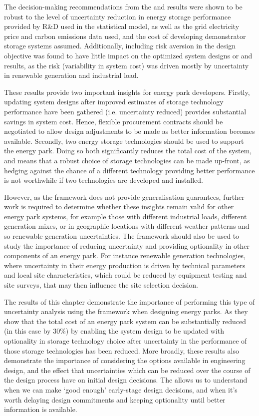 The decision-making recommendations from the  and  results were shown to be robust to the level of uncertainty reduction in energy storage performance provided by R\&D used in the statistical model, as well as the grid electricity price and carbon emissions data used, and the cost of developing demonstrator storage systems assumed.
Additionally, including risk aversion in the design objective was found to have little impact on the optimized system designs or  and  results, as the risk (variability in system cost) was driven mostly by uncertainty in renewable generation and industrial load.

These results provide two important insights for energy park developers. Firstly, updating system designs after improved estimates of storage technology performance have been gathered (i.e. uncertainty reduced) provides substantial savings in system cost. Hence, flexible procurement contracts should be negotiated to allow design adjustments to be made as better information becomes available. Secondly, two energy storage technologies should be used to support the energy park. Doing so both significantly reduces the total cost of the system, and means that a robust choice of storage technologies can be made up-front, as hedging against the chance of a different technology providing better performance is not worthwhile if two technologies are developed and installed.

However, as the  framework does not provide generalisation guarantees, further work is required to determine whether these insights remain valid for other energy park systems, for example those with different industrial loads, different generation mixes, or in geographic locations with different weather patterns and so renewable generation uncertainties.
The framework should also be used to study the importance of reducing uncertainty and providing optionality in other components of an energy park. For instance renewable generation technologies, where uncertainty in their energy production is driven by technical parameters and local site characteristics, which could be reduced by equipment testing and site surveys, that may then influence the site selection decision.

The results of this chapter demonstrate the importance of performing this type of uncertainty analysis using the  framework when designing energy parks. As they show that the total cost of an energy park system can be substantially reduced (in this case by 30\%) by enabling the system design to be updated with optionality in storage technology choice after uncertainty in the performance of those storage technologies has been reduced.
More broadly, these results also demonstrate the importance of considering the options available in engineering design, and the effect that uncertainties which can be reduced over the course of the design process have on initial design decisions. The  allows us to understand when we can make `good enough' early-stage design decisions, and when it's worth delaying design commitments and keeping optionality until better information is available.


